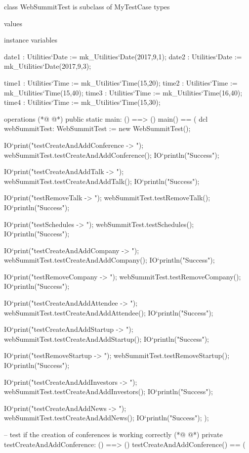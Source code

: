\begin{vdmpp}[breaklines=true]
class WebSummitTest is subclass of MyTestCase
types

values

instance variables

 date1 : Utilities`Date := mk_Utilities`Date(2017,9,1);
 date2 : Utilities`Date := mk_Utilities`Date(2017,9,3);
 
 time1 : Utilities`Time := mk_Utilities`Time(15,20);
 time2 : Utilities`Time := mk_Utilities`Time(15,40);
 time3 : Utilities`Time := mk_Utilities`Time(16,40);
 time4 : Utilities`Time := mk_Utilities`Time(15,30);
 
operations
(*@
\label{main:17}
@*)
public static main: () ==> ()
 main() ==
 (
  dcl webSummitTest: WebSummitTest := new WebSummitTest();
  
  IO`print("testCreateAndAddConference -> ");
  webSummitTest.testCreateAndAddConference();
  IO`println("Success");
  
  IO`print("testCreateAndAddTalk -> ");
  webSummitTest.testCreateAndAddTalk();
  IO`println("Success");
  
  IO`print("testRemoveTalk -> ");
  webSummitTest.testRemoveTalk();
  IO`println("Success");
  
  IO`print("testSchedules -> ");
  webSummitTest.testSchedules();
  IO`println("Success");
  
  IO`print("testCreateAndAddCompany -> ");
  webSummitTest.testCreateAndAddCompany();
  IO`println("Success");
  
  IO`print("testRemoveCompany -> ");
  webSummitTest.testRemoveCompany();
  IO`println("Success");
  
  IO`print("testCreateAndAddAttendee -> ");
  webSummitTest.testCreateAndAddAttendee();
  IO`println("Success");
  
  IO`print("testCreateAndAddStartup -> ");
  webSummitTest.testCreateAndAddStartup();
  IO`println("Success");
  
  IO`print("testRemoveStartup -> ");
  webSummitTest.testRemoveStartup();
  IO`println("Success");
  
  IO`print("testCreateAndAddInvestors -> ");
  webSummitTest.testCreateAndAddInvestors();
  IO`println("Success");
  
  IO`print("testCreateAndAddNews -> ");
  webSummitTest.testCreateAndAddNews();
  IO`println("Success");
 );
 
 -- test if the creation of conferences is working correctly
(*@
\label{testCreateAndAddConference:68}
@*)
 private testCreateAndAddConference: () ==> ()
 testCreateAndAddConference() == (
 

\end{vdmpp}
